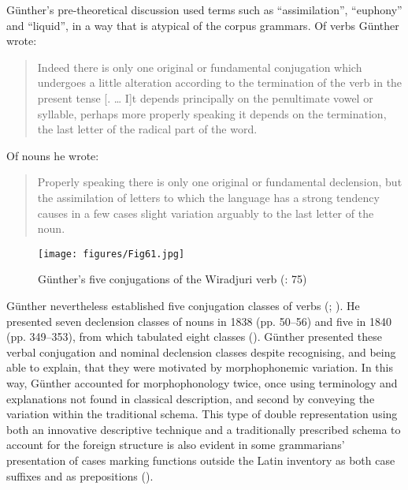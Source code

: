 Günther’s pre-theoretical discussion used terms such as ``assimilation'', “euphony” and ``liquid'', in a way that is atypical of the corpus grammars. Of verbs Günther wrote: 

\begin{quote}
    Indeed there is only one original or fundamental conjugation which undergoes a little alteration according to the termination of the verb in the present tense [. … I]t depends principally on the penultimate vowel or syllable, perhaps more properly speaking it depends on the termination, the last letter of the radical part of the word. \citep[65]{gunther_native_1838}
\end{quote}

Of nouns he wrote: 

\begin{quote}
    Properly speaking there is only one original or fundamental declension, but the assimilation of letters to which the language has a strong tendency causes in a few cases slight variation arguably to the last letter of the noun. \citep[344]{gunther_lecture_1840}
\end{quote}

\begin{figure}[b]
\texttt{[image: figures/Fig61.jpg]}
\caption{Günther’s five conjugations of the Wiradjuri verb (\citeyear{gunther_native_1838}: 75)}
\label{fig:4:61}
\end{figure}


Günther nevertheless established five conjugation classes of verbs (\citeyear[75]{gunther_native_1838}; ). He presented seven declension classes of nouns in 1838 (pp. 50--56) and five in 1840 (pp. 349--353), from which \citet[58]{fraser_australian_1892} tabulated eight classes (). Günther presented these verbal conjugation and nominal declension classes despite recognising, and being able to explain, that they were motivated by morphophonemic variation. In this way, Günther accounted for morphophonology twice, once using terminology and explanations not found in classical description, and second by conveying the variation within the traditional schema. This type of double representation using both an innovative descriptive technique and a traditionally prescribed schema to account for the foreign structure is also evident in some grammarians' presentation of cases marking functions outside the Latin inventory as both case suffixes and as prepositions ().


